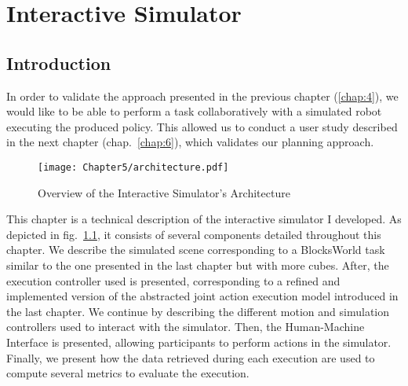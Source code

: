 \ifdefined{}
\else
\setcounter{chapter}{4} %
\dominitoc
\faketableofcontents
\fi

\chapter{Interactive Simulator}
\label{chap:5}
\minitoc


\section{Introduction}

In order to validate the approach presented in the previous chapter (\ref{chap:4}), we would like to be able to perform a task collaboratively with a simulated robot executing the produced policy. This allowed us to conduct a user study described in the next chapter (chap.~\ref{chap:6}), which validates our planning approach.


\begin{figure}
    \texttt{[image: Chapter5/architecture.pdf]}
    \caption{Overview of the Interactive Simulator's Architecture}
    \label{fig:architecture}
\end{figure}

This chapter is a technical description of the interactive simulator I developed. As depicted in fig.~\ref{fig:architecture}, it consists of several components detailed throughout this chapter. We describe the simulated scene corresponding to a BlocksWorld task similar to the one presented in the last chapter but with more cubes. After, the execution controller used is presented, corresponding to a refined and implemented version of the abstracted joint action execution model introduced in the last chapter. We continue by describing the different motion and simulation controllers used to interact with the simulator. Then, the Human-Machine Interface is presented, allowing participants to perform actions in the simulator. Finally, we present how the data retrieved during each execution are used to compute several metrics to evaluate the execution.  

